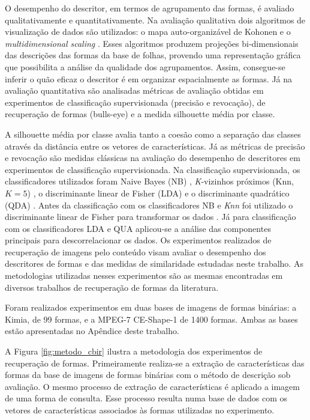 O desempenho do descritor, em termos de agrupamento das formas, é avaliado qualitativamente e quantitativamente. Na avaliação qualitativa dois algoritmos de visualização de dados são utilizados: o mapa auto-organizável de Kohonen \cite{Kohonen:2001} e o \textit{multidimensional scaling} \cite{cox:2000}. Esses algoritmos produzem projeções bi-dimensionais das descrições das formas da base de folhas, provendo uma representação gráfica que possibilita a análise da qualidade dos agrupamentos. Assim, consegue-se inferir o quão eficaz o descritor é em organizar espacialmente as formas. Já na avaliação quantitativa são analisadas métricas de avaliação obtidas em experimentos de classificação supervisionada (precisão e revocação), de recuperação de formas (bulls-eye) e a medida silhouette \cite{Rousseeuw:1987} média por classe. 

A silhouette média por classe avalia tanto a coesão como a separação das classes através da distância entre os vetores de características. Já as métricas de precisão e revocação são medidas clássicas na avaliação do desempenho de descritores em experimentos de classificação supervisionada. Na classificação supervisionada, os classificadores utilizados foram Naive Bayes (NB) \cite{Fukunaga:1990}, \emph{K}-vizinhos próximos (Knn, $K = 5$) \cite{Fukunaga:1990,Webb:2002},  o discriminante linear de Fisher (LDA) \cite{Webb:2002} e o discriminante quadrático (QDA) \cite{Fukunaga:1990}.  Antes da classificação com os classificadores NB e \emph{Knn} foi utilizado o discriminante linear de Fisher para transformar os dados \cite{Webb:2002}. Já para classificação com os classificadores LDA e QUA aplicou-se a análise das componentes principais para descorrelacionar os dados. Os experimentos realizados de recuperação de imagens pelo conteúdo visam avaliar o desempenho dos descritores de formas e das medidas de similaridade estudadas neste trabalho. As metodologias utilizadas nesses experimentos são as mesmas encontradas em diversos trabalhos de recuperação de formas da literatura.

Foram realizados experimentos em duas bases de imagens de formas binárias: a Kimia, de 99 formas, e a MPEG-7 CE-Shape-1 de 1400 formas. Ambas as bases estão apresentadas no Apêndice deste trabalho.

A  Figura \ref{fig:metodo_cbir} ilustra a metodologia dos experimentos de recuperação de formas.  Primeiramente realiza-se a extração de características das formas da base de imagens de formas binárias com o método de descrição sob avaliação. O mesmo processo de extração de características é aplicado a imagem de uma forma de consulta. Esse processo resulta numa base de dados com os vetores de características associados às formas utilizadas no experimento. 

